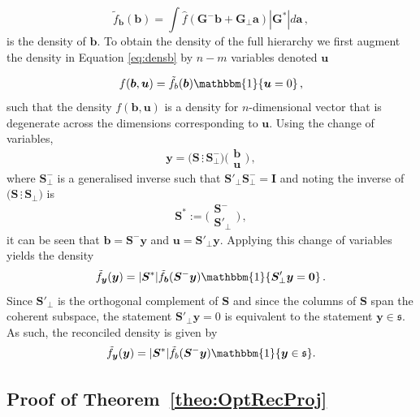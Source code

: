 \documentclass[a4paper,12pt]{article}
\theoremstyle{definition}
\begin{document}
\begin{equation}
\tilde{f}_{\bm{b}}(\bm{b})=\int\hat{f}(\bm{G}^{-}\bm{b}+\bm{G}_{\perp}\bm{a})|\bm{G}^*|d\bm{a}\,,
\label{eq:densb}
\end{equation}
is the density of $\bm{b}$. To obtain the density of the full hierarchy we first augment the density in Equation \eqref{eq:densb} by $n-m$ variables denoted $\bm{u}$

\begin{equation}
f(\bm{b},\bm{u})=\tilde{f}_b(\bm{b})\mathbbm{1}\{\bm{u}=0\}\,,
\end{equation}
such that the density $f(\bm{b},\bm{u})$ is a density for $n$-dimensional vector that is degenerate across the dimensions corresponding to $\bm{u}$. Using the change of variables,
\[
\bm{y}=\big(\bm{S}\,\vdots\,\bm{S}^-_{\perp}\big)\bigg(\begin{matrix}\bm{b}\\[-0.3cm]
\bm{u}
\end{matrix}\bigg)\,,
\]
where $\bm{S}^-_{\perp}$ is a generalised inverse such that $\bm{S}'_{\perp}\bm{S}^-_{\perp}=\bm{I}$ and noting the inverse of $\big(\bm{S}\,\vdots\,\bm{S}_{\perp}\big)$ is
\[
\bm{S}^*:=\bigg(\begin{matrix}\bm{S}^{-}\\[-0.2cm]\bm{S}'_{\perp}\end{matrix}\bigg)\,,
\]
it can be seen that $\bm{b}=\bm{S}^-\bm{y}$ and $\bm{u}=\bm{S}'_\perp\bm{y}$. Applying this change of variables yields the density
\[
\tilde{f}_{\bm{y}}(\bm{y})=|\bm{S}^*|\tilde{f}_{\bm{b}}(\bm{S}^-\bm{y})\mathbbm{1}\{\bm{S}'_\perp\bm{y}=\bm{0}\}\,.
\]
Since $\bm{S}'_\perp$ is the orthogonal complement of $\bm{S}$ and since the columns of $\bm{S}$ span the coherent subspace, the statement $\bm{S}'_\perp\bm{y}=0$ is equivalent to the statement $\bm{y}\in\mathfrak{s}$. As such, the reconciled density is given by
\[
\tilde{f}_{\bm{y}}(\bm{y})=|\bm{S}^*|\tilde{f}_b(\bm{S}^-\bm{y})\mathbbm{1}\{\bm{y}\in\mathfrak{s}\}.
\]

\subsection{Proof of Theorem~\ref{theo:OptRecProj}}
\label{app:OptRecProj}
\end{document}
